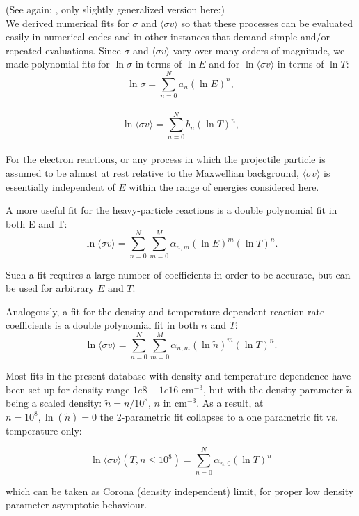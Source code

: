\documentclass[12pt,dvipdfmx]{article}
\begin{document}
(See again: \cite{kn:Janev}, only slightly generalized version here:)
\\

We derived numerical fits for $\sigma$ and $\langle\sigma v\rangle$ so that these processes can be evaluated easily in
numerical codes and in other instances that demand simple and/or repeated evaluations. Since $\sigma$ and $\langle\sigma v\rangle$
vary over many orders of magnitude, we made polynomial fits for $\ln \sigma$ in terms of $\ln E$ and for $\ln \langle\sigma v\rangle$
in terms of $\ln T$:\\

      $$\ln \sigma = \sum_{n=0}^N a_n (\ln E)^n, $$\\


      $$\ln \langle\sigma v\rangle = \sum_{n=0}^N b_n (\ln T)^n, $$\\


For the electron reactions, or any process in which the projectile particle is assumed to be almost at rest
relative to the Maxwellian background, $\langle\sigma v\rangle$ is essentially independent of $E$ within the range of energies considered
here.

A more useful fit for the heavy-particle reactions is a double polynomial fit in both E and T:\\

      $$\ln \langle\sigma v\rangle = \sum_{n=0}^N\sum_{m=0}^M \alpha_{n,m}(\ln E)^m(\ln T)^n.$$

Such a fit requires a large number of coefficients in order to be accurate, but can be used for arbitrary
$E$ and $T$.

Analogously, a fit for the density and temperature dependent reaction rate coefficients
is a double polynomial fit in both $n$ and $T$:\\

      $$\ln \langle\sigma v\rangle = \sum_{n=0}^N\sum_{m=0}^M \alpha_{n,m}(\ln \tilde{n})^m(\ln T)^n.$$

Most fits in the present database with density and temperature dependence have been set up for density range $1e8 - 1e16$ cm$^{-3}$,
but with the density parameter $\tilde n$ being a scaled density: $\tilde n = n/10^8$, $n$ in cm$^{-3}$.
As a result, at $n = 10^8, \ln(\tilde{n}) = 0$ the 2-parametric fit collapses to a one parametric fit vs. temperature only:

$$\ln \langle\sigma v\rangle(T, n\leq 10^8) = \sum_{n=0}^N \alpha_{n,0}(\ln T)^n$$

which can be taken as Corona (density independent) limit, for proper low density parameter asymptotic behaviour.
\end{document}
